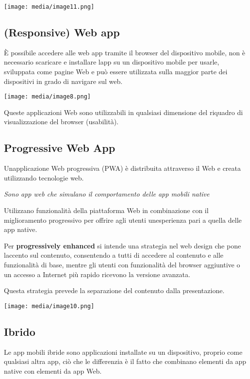 \texttt{[image: media/image11.png]}

\subsection{(Responsive) Web app}\label{responsive-web-app}

È possibile accedere alle web app tramite il browser del dispositivo
mobile, non è necessario scaricare e installare l\textquotesingle app su
un dispositivo mobile per usarle, sviluppata come pagine Web e può
essere utilizzata sulla maggior parte dei dispositivi in grado di
navigare sul web.

\texttt{[image: media/image8.png]}

Queste applicazioni Web sono utilizzabili in qualsiasi dimensione del
riquadro di visualizzazione del browser (usabilità).

\subsection{Progressive Web App}\label{progressive-web-app}

Un\textquotesingle applicazione Web progressiva (PWA) è distribuita
attraverso il Web e creata utilizzando tecnologie web.

\emph{Sono app web che simulano il comportamento delle app mobili
native}

Utilizzano funzionalità della piattaforma Web in combinazione con il
miglioramento progressivo per offrire agli utenti
un\textquotesingle esperienza pari a quella delle app native.

Per \textbf{progressively enhanced} si intende una strategia nel web
design che pone l\textquotesingle accento sul contenuto, consentendo a
tutti di accedere al contenuto e alle funzionalità di base, mentre gli
utenti con funzionalità del browser aggiuntive o un accesso a Internet
più rapido ricevono la versione avanzata.

Questa strategia prevede la separazione del contenuto dalla
presentazione.

\texttt{[image: media/image10.png]}

\subsection{Ibrido}\label{ibrido}

Le app mobili ibride sono applicazioni installate su un dispositivo,
proprio come qualsiasi altra app, ciò che le differenzia è il fatto che
combinano elementi da app native con elementi da app Web.


